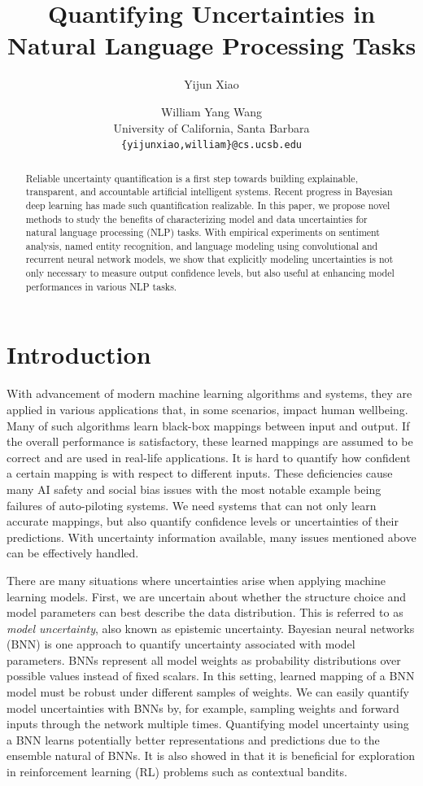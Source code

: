 \documentclass[letterpaper]{article} %
\title{Quantifying Uncertainties in Natural Language Processing Tasks}
\author{Yijun Xiao \and William Yang Wang\\
University of California, Santa Barbara\\
  {\tt \{yijunxiao,william\}@cs.ucsb.edu} \\
}
\begin{document}
\maketitle
\begin{abstract}
Reliable uncertainty quantification is a first step towards building explainable, transparent, and accountable artificial intelligent systems. Recent progress in Bayesian deep learning has made such quantification realizable. In this paper, we propose novel methods to study the benefits of characterizing model and data uncertainties for natural language processing (NLP) tasks. With empirical experiments on sentiment analysis, named entity recognition, and language modeling using convolutional and recurrent neural network models, we show that explicitly modeling uncertainties is not only necessary to measure output confidence levels, but also useful at enhancing model performances in various NLP tasks.
\end{abstract}

\section{Introduction}
With advancement of modern machine learning algorithms and systems, they are applied in various applications that, in some scenarios, impact human wellbeing. Many of such algorithms learn black-box mappings between input and output. If the overall performance is satisfactory, these learned mappings are assumed to be correct and are used in real-life applications. It is hard to quantify how confident a certain mapping is with respect to different inputs. These deficiencies cause many AI safety and social bias issues with the most notable example being failures of auto-piloting systems. We need systems that can not only learn accurate mappings, but also quantify confidence levels or uncertainties of their predictions. With uncertainty information available, many issues mentioned above can be effectively handled.

There are many situations where uncertainties arise when applying machine learning models. First, we are uncertain about whether the structure choice and model parameters can best describe the data distribution. This is referred to as \textit{model uncertainty}, also known as epistemic uncertainty. Bayesian neural networks (BNN) \cite{buntine1991bayesian,denker1991transforming,mackay1992practical,mackay1995probable,neal2012bayesian} is one approach to quantify uncertainty associated with model parameters. BNNs represent all model weights as probability distributions over possible values instead of fixed scalars. In this setting, learned mapping of a BNN model must be robust under different samples of weights. We can easily quantify model uncertainties with BNNs by, for example, sampling weights and forward inputs through the network multiple times. Quantifying model uncertainty using a BNN learns potentially better representations and predictions due to the ensemble natural of BNNs. It is also showed in \cite{blundell2015weight} that it is beneficial for exploration in reinforcement learning (RL) problems such as contextual bandits.
\end{document}
